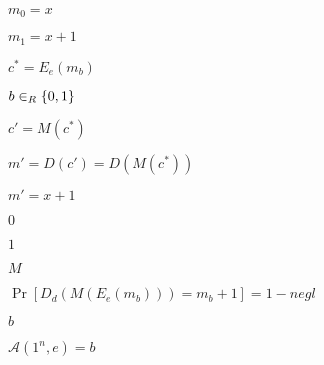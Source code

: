 \documentclass[10pt]{book}
\begin{document}
\begin{mdSnippets}
\begin{mdInlineSnippet}%
$m_0 = x$\end{mdInlineSnippet}%
\begin{mdInlineSnippet}[0d590a835b5b488f7511966ac6cdc9fb]%
$m_1 = x + 1$\end{mdInlineSnippet}%
\begin{mdInlineSnippet}[72363e6a2c09a846643053b07c46665e]%
$c^* = E_e(m_b)$\end{mdInlineSnippet}%
\begin{mdInlineSnippet}%
$b \in_R \{0,1\}$\end{mdInlineSnippet}%
\begin{mdInlineSnippet}[b6db7645094c920a7103fbbd8d4b2a8b]%
$c' = M(c^*)$\end{mdInlineSnippet}%
\begin{mdInlineSnippet}[2e8a8997007ea042026535fcce8cf10b]%
$m' = D(c') = D(M(c^*))$\end{mdInlineSnippet}%
\begin{mdInlineSnippet}%
$m' = x + 1$\end{mdInlineSnippet}%
\begin{mdInlineSnippet}%
$0$\end{mdInlineSnippet}%
\begin{mdInlineSnippet}[c4ca4238a0b923820dcc509a6f75849b]%
$1$\end{mdInlineSnippet}%
\begin{mdInlineSnippet}[69691c7bdcc3ce6d5d8a1361f22d04ac]%
$M$\end{mdInlineSnippet}%
\begin{mdInlineSnippet}[86ee4ea7c7a0b23c402782c011838916]%
$\Pr[D_d(M(E_e(m_b))) = m_b + 1] = 1 - negl$\end{mdInlineSnippet}%
\begin{mdInlineSnippet}%
$b$\end{mdInlineSnippet}%
\begin{mdInlineSnippet}[c3756a3108bedc440ee6eb34c0619164]%
$\mathcal{A}(1^n,e) = b$\end{mdInlineSnippet}%

\end{mdSnippets}
\end{document}
